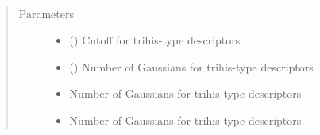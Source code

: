 \documentclass[letterpaper,10pt,english]{sphinxmanual}
\begin{document}

\begin{fulllineitems}
\label{\detokenize{descriptors:gap.descriptors.trihis}}~\begin{quote}\begin{description}
\item[{Parameters}] \leavevmode\begin{itemize}
\item {} 
 () \textendash{} Cutoff for trihis-type descriptors

\item {} 
 () \textendash{} Number of Gaussians for trihis-type descriptors

\item {} 
 \textendash{} Number of Gaussians for trihis-type descriptors

\item {} 
 \textendash{} Number of Gaussians for trihis-type descriptors

\end{itemize}

\end{description}\end{quote}

\end{fulllineitems}

\end{document}
